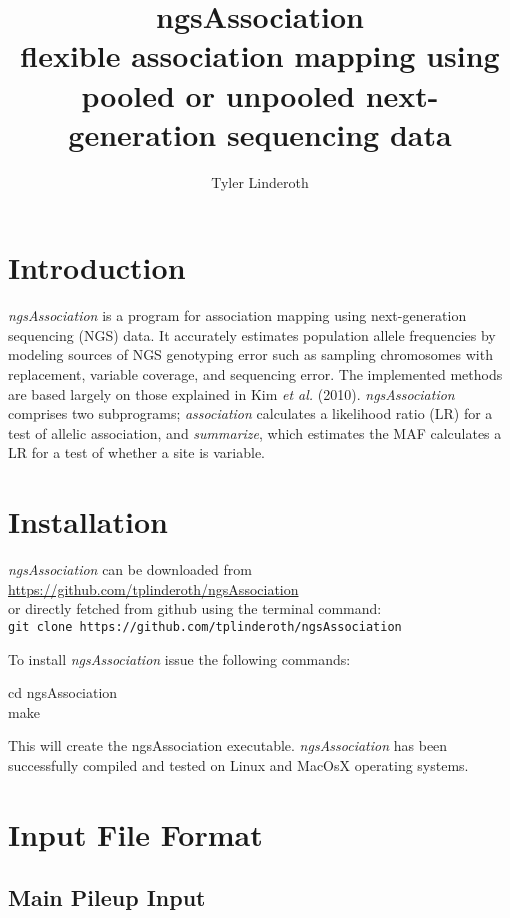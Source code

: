 \documentclass[12pt]{article}
\title{ngsAssociation\\flexible association mapping using pooled or unpooled next-generation sequencing data}
\author{Tyler Linderoth}
\date{}
\newenvironment{codeblock}{ \begin{framed}\ttfamily}{ \end{framed} }
\begin{document}
\maketitle

\tableofcontents
\newpage

\section{Introduction}
\textit{ngsAssociation} is a program for association mapping using next-generation sequencing (NGS) data. It accurately estimates population allele frequencies by modeling sources of NGS genotyping error such as sampling chromosomes with replacement, variable coverage, and sequencing error. The implemented methods are based largely on those explained in Kim {\it et al.} (2010). \textit{ngsAssociation} comprises two subprograms; \textit{association} calculates a likelihood ratio (LR) for a test of allelic association, and \textit{summarize}, which estimates the MAF calculates a LR for a test of whether a site is variable.

\section{Installation}
\setlength{\parindent}{0cm}
\textit{ngsAssociation} can be downloaded from\\\url{https://github.com/tplinderoth/ngsAssociation}\\or directly fetched from 
github using the terminal command:\\
\texttt{git clone https://github.com/tplinderoth/ngsAssociation}

\vspace{5mm}

To install \textit{ngsAssociation} issue the following commands:

\begin{codeblock}
cd ngsAssociation\\
make
\end{codeblock}

This will create the ngsAssociation executable. \textit{ngsAssociation} has been successfully compiled and tested on Linux and MacOsX operating systems.

\section{Input File Format}

\subsection{Main Pileup Input}
\end{document}
